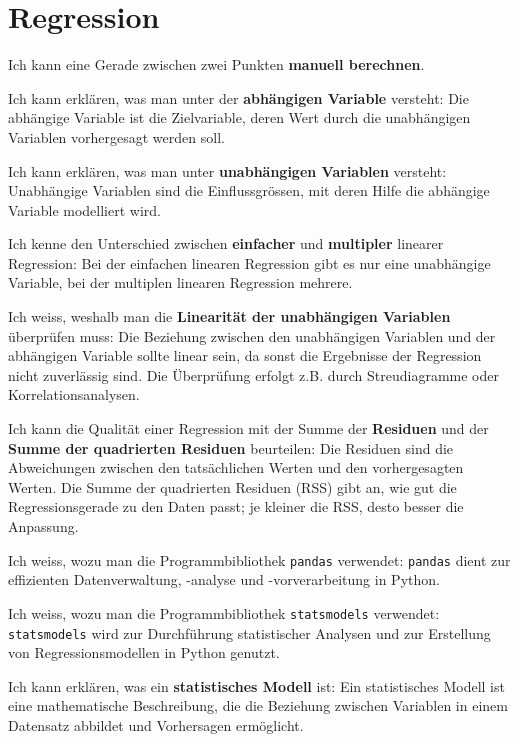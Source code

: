 \section{Regression}
\begin{todolist}
	\item Ich kann eine Gerade zwischen zwei Punkten \textbf{manuell berechnen}.
	\item Ich kann erklären, was man unter der \textbf{abhängigen Variable} versteht: Die abhängige Variable ist die Zielvariable, deren Wert durch die unabhängigen Variablen vorhergesagt werden soll.
	\item Ich kann erklären, was man unter \textbf{unabhängigen Variablen} versteht: Unabhängige Variablen sind die Einflussgrössen, mit deren Hilfe die abhängige Variable modelliert wird.
	\item Ich kenne den Unterschied zwischen \textbf{einfacher} und \textbf{multipler} linearer Regression: Bei der einfachen linearen Regression gibt es nur eine unabhängige Variable, bei der multiplen linearen Regression mehrere.
	\item Ich weiss, weshalb man die \textbf{Linearität der unabhängigen Variablen} überprüfen muss: Die Beziehung zwischen den unabhängigen Variablen und der abhängigen Variable sollte linear sein, da sonst die Ergebnisse der Regression nicht zuverlässig sind. Die Überprüfung erfolgt z.B. durch Streudiagramme oder Korrelationsanalysen.
	\item Ich kann die Qualität einer Regression mit der Summe der \textbf{Residuen} und der \textbf{Summe der quadrierten Residuen} beurteilen: Die Residuen sind die Abweichungen zwischen den tatsächlichen Werten und den vorhergesagten Werten. Die Summe der quadrierten Residuen (RSS) gibt an, wie gut die Regressionsgerade zu den Daten passt; je kleiner die RSS, desto besser die Anpassung.
	\item Ich weiss, wozu man die Programmbibliothek \texttt{pandas} verwendet: \texttt{pandas} dient zur effizienten Datenverwaltung, -analyse und -vorverarbeitung in Python.
	\item Ich weiss, wozu man die Programmbibliothek \texttt{statsmodels} verwendet: \texttt{statsmodels} wird zur Durchführung statistischer Analysen und zur Erstellung von Regressionsmodellen in Python genutzt.
	\item Ich kann erklären, was ein \textbf{statistisches Modell} ist: Ein statistisches Modell ist eine mathematische Beschreibung, die die Beziehung zwischen Variablen in einem Datensatz abbildet und Vorhersagen ermöglicht.
\end{todolist}

